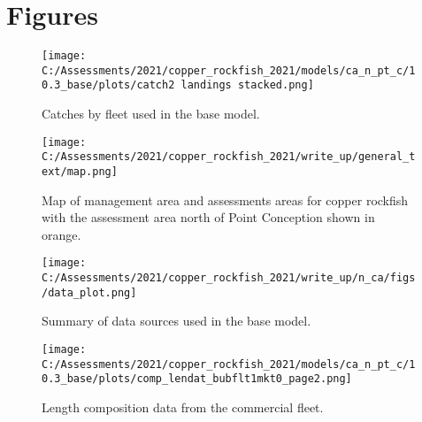 \documentclass[11pt,
  english,
  a4paper,
]{article}
\begin{document}
\clearpage

\clearpage


\hypertarget{figures}{%
\section{Figures}\label{figures}}

\leavevmode\tagmcend\tagstructend


\begin{figure}
\centering
\texttt{[image: C:/Assessments/2021/copper\_rockfish\_2021/models/ca\_n\_pt\_c/10.3\_base/plots/catch2 landings stacked.png]}
\caption{Catches by fleet used in the base model.\label{fig:catch}}
\end{figure}

\tagmcend\tagstructend


\begin{figure}
\centering
\texttt{[image: C:/Assessments/2021/copper\_rockfish\_2021/write\_up/general\_text/map.png]}
\caption{Map of management area and assessments areas for copper rockfish with the assessment area north of Point Conception shown in orange.\label{fig:map}}
\end{figure}

\tagmcend\tagstructend


\begin{figure}
\centering
\texttt{[image: C:/Assessments/2021/copper\_rockfish\_2021/write\_up/n\_ca/figs/data\_plot.png]}
\caption{Summary of data sources used in the base model.\label{fig:data-plot}}
\end{figure}

\tagmcend\tagstructend


\begin{figure}
\centering
\texttt{[image: C:/Assessments/2021/copper\_rockfish\_2021/models/ca\_n\_pt\_c/10.3\_base/plots/comp\_lendat\_bubflt1mkt0\_page2.png]}
\caption{Length composition data from the commercial fleet.\label{fig:com-len-data}}
\end{figure}
\end{document}
